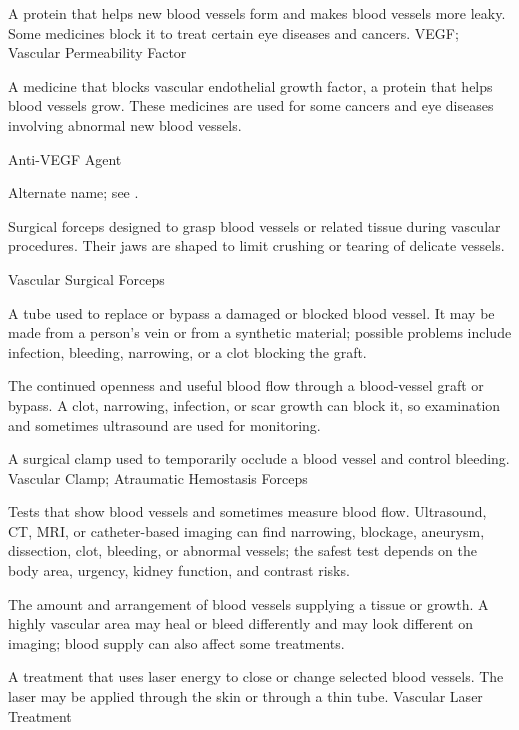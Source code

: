  A protein that helps new blood vessels form and makes blood vessels more leaky. Some medicines block it to treat certain eye diseases and cancers.
\synonyms
VEGF; Vascular Permeability Factor

 A medicine that blocks vascular endothelial growth factor, a protein that helps blood vessels grow. These medicines are used for some cancers and eye diseases involving abnormal new blood vessels.

\synonyms
Anti-VEGF Agent

 Alternate name; see .

 Surgical forceps designed to grasp blood vessels or related tissue during vascular procedures. Their jaws are shaped to limit crushing or tearing of delicate vessels.

\synonyms
Vascular Surgical Forceps

 A tube used to replace or bypass a damaged or blocked blood vessel. It may be made from a person's vein or from a synthetic material; possible problems include infection, bleeding, narrowing, or a clot blocking the graft.

 The continued openness and useful blood flow through a blood-vessel graft or bypass. A clot, narrowing, infection, or scar growth can block it, so examination and sometimes ultrasound are used for monitoring.

 A surgical clamp used to temporarily occlude a blood vessel and control bleeding.
\synonyms
Vascular Clamp; Atraumatic Hemostasis Forceps

 Tests that show blood vessels and sometimes measure blood flow. Ultrasound, CT, MRI, or catheter-based imaging can find narrowing, blockage, aneurysm, dissection, clot, bleeding, or abnormal vessels; the safest test depends on the body area, urgency, kidney function, and contrast risks.

 The amount and arrangement of blood vessels supplying a tissue or growth. A highly vascular area may heal or bleed differently and may look different on imaging; blood supply can also affect some treatments.

 A treatment that uses laser energy to close or change selected blood vessels. The laser may be applied through the skin or through a thin tube.
\synonyms
Vascular Laser Treatment

